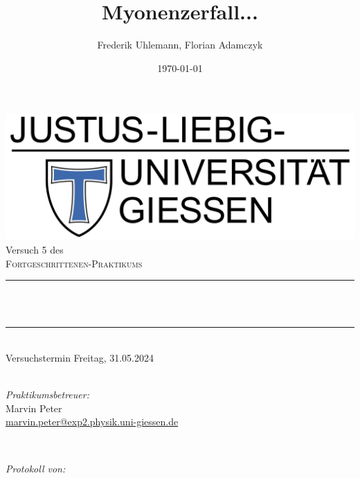 \documentclass[12pt,a4paper,ngerman]{report}
\title{Myonenzerfall...}			%
\author{Frederik Uhlemann, Florian Adamczyk}
\date{\today}
\makeatletter
\let\thetitle\@title
\makeatother
\begin{document}
		
	
	\begin{titlepage}
		\centering
		\vspace*{0.5 cm}
		\includegraphics[width = 0.6 \textwidth]{JLU_Giessen-Logo}	%
		\\[2.0 cm]
		Versuch 5 des\\
		\textsc{\Large  Fortgeschrittenen-Praktikums}\\ [0.3 cm]				%
		\rule{\linewidth}{0.2 mm} \\[0.4 cm]
		{ \huge \bfseries \thetitle}\\%
		\rule{\linewidth}{0.2 mm}\\
		Versuchstermin Freitag, 31.05.2024 \\
		~ \\
		[2.0 cm]
		
		
		\begin{minipage}{0.49\textwidth}
			\begin{flushleft}
				 \emph{Praktikumsbetreuer:}\\
				 Marvin Peter\\
				 \small{\href{mailto:marvin.peter@exp2.physik.uni-giessen.de}{marvin.peter@exp2.physik.uni-giessen.de}}
			\end{flushleft}
		\end{minipage}~
		\begin{minipage}{0.49\textwidth}
			\begin{flushright}
				\emph{Protokoll von:} \\
				

\end{flushright}
\end{minipage}
\end{titlepage}
\end{document}

